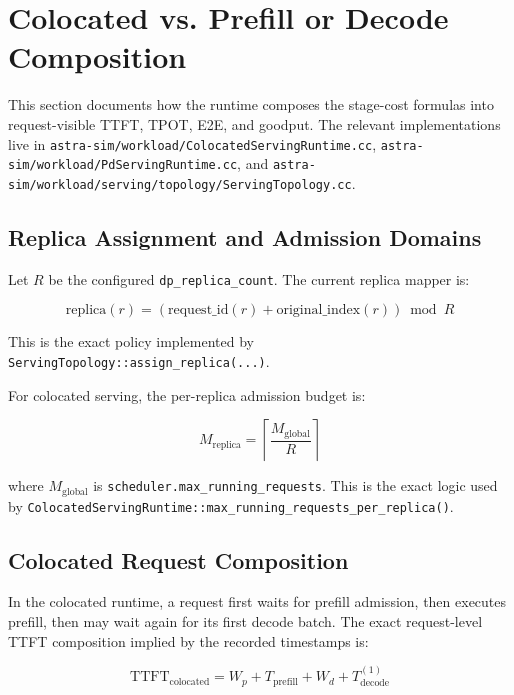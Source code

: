 \section{Colocated vs. Prefill or Decode Composition}

This section documents how the runtime composes the stage-cost formulas into
request-visible TTFT, TPOT, E2E, and goodput. The relevant implementations live
in \texttt{astra-sim/workload/ColocatedServingRuntime.cc},
\texttt{astra-sim/workload/PdServingRuntime.cc}, and
\texttt{astra-sim/workload/serving/topology/ServingTopology.cc}.

\subsection{Replica Assignment and Admission Domains}

Let \(R\) be the configured \texttt{dp\_replica\_count}. The current replica
mapper is:

\begin{equation*}
\mathrm{replica}(r) =
\left(
\mathrm{request\_id}(r) + \mathrm{original\_index}(r)
\right)
\bmod R
\end{equation*}

This is the exact policy implemented by
\texttt{ServingTopology::assign\_replica(...)}.

For colocated serving, the per-replica admission budget is:

\begin{equation*}
M_{\mathrm{replica}} =
\left\lceil
\frac{M_{\mathrm{global}}}{R}
\right\rceil
\end{equation*}

where \(M_{\mathrm{global}}\) is
\texttt{scheduler.max\_running\_requests}. This is the exact logic used by
\texttt{ColocatedServingRuntime::max\_running\_requests\_per\_replica()}.

\subsection{Colocated Request Composition}

In the colocated runtime, a request first waits for prefill admission, then
executes prefill, then may wait again for its first decode batch. The exact
request-level TTFT composition implied by the recorded timestamps is:

\begin{equation*}
\mathrm{TTFT}_{\mathrm{colocated}} =
W_p + T_{\mathrm{prefill}} + W_d + T_{\mathrm{decode}}^{(1)}
\end{equation*}


